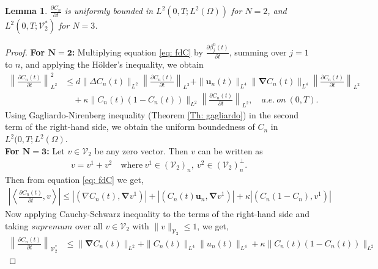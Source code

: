 \documentclass[final,3p,times]{elsarticle}
\newtheorem{lemma}{Lemma}
\theoremstyle{plain}
\theoremstyle{remark}
\newcommand{\lV}{\lVert}
\newcommand{\rV}{\rVert}
\newcommand{\lf}{\left}
\newcommand{\rg}{\right}
\theoremstyle{plain}
\theoremstyle{remark}
\begin{document}
\begin{lemma}
$ \displaystyle \frac{\partial C_n}{\partial t}$ is uniformly bounded in $L^{2}\left(0,T;L^2(\Omega)\right)$ for $N=2$, and $L^{2}\left(0,T;\mathscr V_2^*\right)$ for $N=3$. \label{lemma:L3}
\end{lemma}  
\begin{proof}
\textbf{For $\boldsymbol{N=2}$:}
Multiplying equation \eqref{eq: fdC} by \(  \displaystyle \frac{\partial \beta_{j}^{n} \left(t\right)}{\partial t} \), summing over \( j = 1 \) to \( n \), and applying the H\"older's inequality, we obtain 
\begin{align}
\left \| \frac{\partial C_n \left(t\right)}{\partial t} \right \|_{L^2}^2 
&\leq d \|\Delta C_n \left(t\right)\|_{L^2}\lf \lVert \frac{\partial C_n \left(t\right)}{\partial t} \rg\rVert_{L^2}  
+ \|\mathbf u_n \left(t\right) \|_{L^4}\| \boldsymbol{\nabla} C_n \left(t\right) \|_{L^4} \left \lV \frac{\partial C_n \left(t\right)}{\partial t} \right \rV_{L^{2}} \nonumber \\ 
&\quad + \kappa \|C_n \left(t\right)\left(1 - C_n \left(t\right)\right)\|_{L^2}\lf \| \frac{\partial C_n \left(t\right)}{\partial t}\rg \|_{L^2}, \quad a.e.\ on \ \left(0,T\right).
\label{eq: estimate of del c/del t 1st}
\end{align}
Using Gagliardo-Nirenberg inequality (Theorem \ref{Th: gagliardo}) in the second term of the right-hand side, we obtain the uniform boundedness of $C_n$ in $L^2(0,T;L^2(\Omega).$\\
\textbf{For $\boldsymbol{N=3}$:}
Let $v\in \mathscr V_2$ be any zero vector.
Then $v$ can be written as
\begin{align*}
    v = v^1 + v^2 \quad \text{where}\ v^1\in \left(\mathscr V_2\right)_n,\ v^2\in \left(\mathscr V_2\right)_n ^ \perp.
\end{align*}
Then from equation \eqref{eq: fdC} we get,
\begin{align}
    \left|\left\langle\frac{\partial C_n \left(t\right)}{\partial t},v\right\rangle\right|\leq \left|
    \left(\nabla C_n(t),\boldsymbol\nabla v^1\right)\right| + \left|
    \left( C_n(t)\mathbf{u}_n,\boldsymbol\nabla v^1\right)\right| + \kappa\left|
    \left( C_n(1-C_n),v^1\right)\right|
\end{align}
Now applying Cauchy-Schwarz inequality to the terms of the right-hand side and taking $supremum$ over all $ v \in \mathscr V_2$ with $\|v\|_{\mathscr V_2} \le1$, we get,
 \begin{align}
     \left\|\frac{\partial C_n \left(t\right)}{\partial t}\right\|_{\mathscr V_2^*} &\leq \|\boldsymbol\nabla C_n(t)\|_{L^2} + \|C_n(t)\|_{L^4}\|u_n(t)\|_{L^4} + \kappa \|C_n(t)(1-C_n(t))\|_{L^2}\nonumber

\end{align}
\end{proof}
\end{document}
